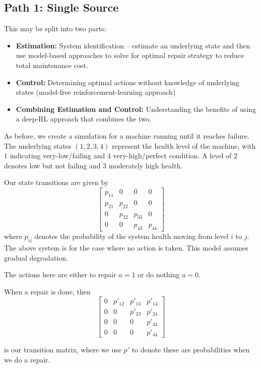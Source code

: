 \documentclass[english]{article}
\numberwithin{equation}{section}
\begin{document}
\subsection*{Path 1: Single Source}
This may be split into two parts:

\begin{itemize}
	\item \textbf{Estimation:} System identification -- estimate an underlying state and then use model-based approaches to solve for optimal repair strategy to reduce total maintenance cost.
	\item \textbf{Control:} Determining optimal actions without knowledge of underlying states (model-free reinforcement-learning approach)
	\item \textbf{Combining Estimation and Control:} Understanding the benefits of using a deep-RL approach that combines the two.
\end{itemize}


As before, we create a simulation for a machine running until it reaches failure. The underlying states $(1,2,3,4)$ represent the health level of the machine, with $1$ indicating very-low/failing and $4$ very-high/perfect condition. A level of $2$ denotes low but not failing and $3$ moderately high health.

Our state transitions are given by 
$$
\begin{bmatrix}
p_{11} & 0 & 0 & 0 \\
p_{21} & p_{22} & 0 & 0 \\
0 & p_{32} & p_{33} & 0 \\
0 & 0 & p_{43} & p_{44}
\end{bmatrix}
$$
where $p_{ij}$ denotes the probability of the system health moving from level $i$ to $j$. The above system is for the case where no action is taken. This model assumes gradual degradation.

The actions here are either to repair $a=1$ or do nothing $a=0$.

When a repair is done, then
$$
\begin{bmatrix}
0 & p'_{12} & p'_{13} & p'_{14} \\
0 & 0 & p'_{23} & p'_{24} \\
0 & 0 & 0 & p'_{34} \\
0 & 0 & 0 & p'_{44}
\end{bmatrix}
$$

is our transition matrix, where we use $p'$ to denote these are probabilities when we do a repair.
\end{document}

